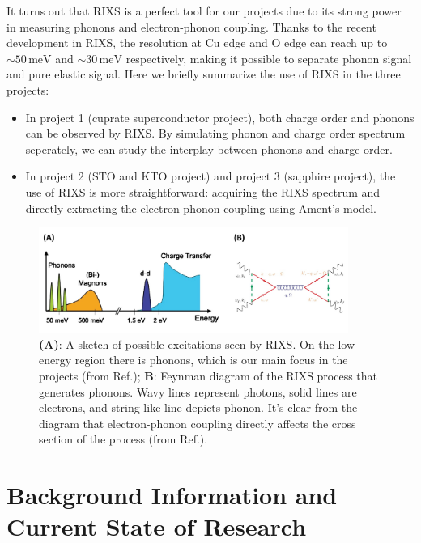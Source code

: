 \documentclass[11pt]{article}
\begin{document}
It turns out that RIXS is a perfect tool for our projects due to its strong power in measuring phonons and electron-phonon coupling. Thanks to the recent development in RIXS, the resolution at $\mathrm{Cu}$ edge and $\mathrm{O}$ edge can reach up to $\sim 50\,\mathrm{meV}$ and $\sim 30\,\mathrm{meV}$ respectively, making it possible to separate phonon signal and pure elastic signal. Here we briefly summarize the use of RIXS in the three projects:
\begin{itemize}
  \item In project 1 (cuprate superconductor project), both charge order and phonons can be observed by RIXS. By simulating phonon and charge order spectrum seperately, we can study the interplay between phonons and charge order. 
  \item In project 2 (STO and KTO project) and project 3 (sapphire project), the use of RIXS is more straightforward: acquiring the RIXS spectrum and directly extracting the electron-phonon coupling using Ament's model.
\end{itemize}


\begin{figure}[!t]
    \centering
    \includegraphics[width=0.9\textwidth]{figures/figure2.jpg}
    \caption{\textbf{(A)}: A sketch of possible excitations seen by RIXS. On the low-energy region there is phonons, which is our main focus in the projects (from Ref.\cite{ament_resonant_2011}); \textbf{B}: Feynman diagram of the RIXS process that generates phonons. Wavy lines represent photons, solid lines are electrons, and string-like line depicts phonon. It's clear from the diagram that electron-phonon coupling directly affects the cross section of the process (from Ref.\cite{devereaux_directly_2016}).}  
    \label{second_figure}
\end{figure}

\section{Background Information and Current State of Research}
\end{document}
